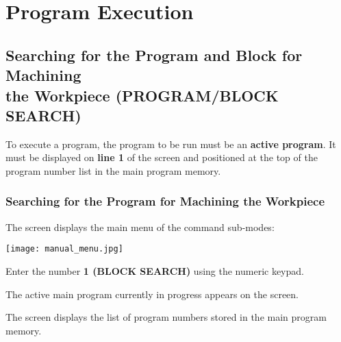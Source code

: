 \chapter{Program Execution}

\section{Searching for the Program and Block for Machining \\ the Workpiece (PROGRAM/BLOCK SEARCH)}

To execute a program, the program to be run must be an \textbf{active program}.  
It must be displayed on \textbf{line 1} of the screen and positioned at the top of the program number list in the main program memory.

\subsection{Searching for the Program for Machining the Workpiece}

\begin{itemize}
\end{itemize}

\vspace{.5cm}

\begin{itemize}
\end{itemize}

\vspace{.5cm}

The screen displays the main menu of the command sub-modes:

\begin{center}
    \texttt{[image: manual\_menu.jpg]}
\end{center}

\vspace{.5cm}

Enter the number \textbf{1 (BLOCK SEARCH)} using the numeric keypad.

The active main program currently in progress appears on the screen.

\newpage

\begin{itemize}
\end{itemize}

The screen displays the list of program numbers stored in the main program memory.

